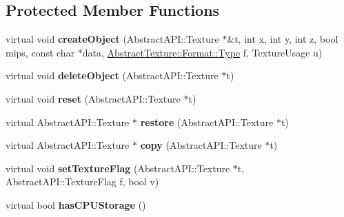 \subsection*{Protected Member Functions}
\begin{DoxyCompactItemize}
\item 
\hypertarget{class_tempest_1_1_volume_holder_abb859f79c7d825b44631f7a465ebfd90}{virtual void {\bfseries create\+Object} (Abstract\+A\+P\+I\+::\+Texture $\ast$\&t, int x, int y, int z, bool mips, const char $\ast$data, \hyperlink{struct_tempest_1_1_abstract_texture_1_1_format_a231a1f516e53783bf72c713669b115b3}{Abstract\+Texture\+::\+Format\+::\+Type} f, Texture\+Usage u)}\label{class_tempest_1_1_volume_holder_abb859f79c7d825b44631f7a465ebfd90}

\item 
\hypertarget{class_tempest_1_1_volume_holder_a248076fbafa8f4c3c1d7a00d33028ea5}{virtual void {\bfseries delete\+Object} (Abstract\+A\+P\+I\+::\+Texture $\ast$t)}\label{class_tempest_1_1_volume_holder_a248076fbafa8f4c3c1d7a00d33028ea5}

\item 
\hypertarget{class_tempest_1_1_volume_holder_ae4e46b46ed29940bebf91107f62491e9}{virtual void {\bfseries reset} (Abstract\+A\+P\+I\+::\+Texture $\ast$t)}\label{class_tempest_1_1_volume_holder_ae4e46b46ed29940bebf91107f62491e9}

\item 
\hypertarget{class_tempest_1_1_volume_holder_a15cd731c1b6281d5a76b5cb0ebec6d1b}{virtual Abstract\+A\+P\+I\+::\+Texture $\ast$ {\bfseries restore} (Abstract\+A\+P\+I\+::\+Texture $\ast$t)}\label{class_tempest_1_1_volume_holder_a15cd731c1b6281d5a76b5cb0ebec6d1b}

\item 
\hypertarget{class_tempest_1_1_volume_holder_a0b0cfcbd9f9761b729621506f893c07c}{virtual Abstract\+A\+P\+I\+::\+Texture $\ast$ {\bfseries copy} (Abstract\+A\+P\+I\+::\+Texture $\ast$t)}\label{class_tempest_1_1_volume_holder_a0b0cfcbd9f9761b729621506f893c07c}

\item 
\hypertarget{class_tempest_1_1_volume_holder_aeb65ff46ded27da41cde012aa3fea305}{virtual void {\bfseries set\+Texture\+Flag} (Abstract\+A\+P\+I\+::\+Texture $\ast$t, Abstract\+A\+P\+I\+::\+Texture\+Flag f, bool v)}\label{class_tempest_1_1_volume_holder_aeb65ff46ded27da41cde012aa3fea305}

\item 
\hypertarget{class_tempest_1_1_volume_holder_a80e889de471e63806dfc2e3b2141e197}{virtual bool {\bfseries has\+C\+P\+U\+Storage} ()}\label{class_tempest_1_1_volume_holder_a80e889de471e63806dfc2e3b2141e197}

\end{DoxyCompactItemize}
